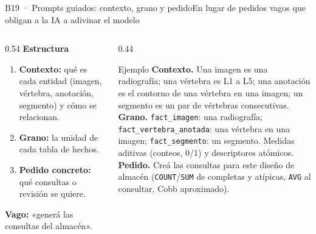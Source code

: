 \documentclass[aspectratio=169,10pt]{beamer}
\begin{document}
\begin{frame}{B19 · Prompts guiados: contexto, grano y pedido}{En lugar de pedidos vagos que obligan a la IA a adivinar el modelo}
  \begin{columns}[T]
    \begin{column}{0.54\textwidth}
      \footnotesize
      \textbf{\color{itba}Estructura}
      \begin{enumerate}\setlength{\itemsep}{0.4ex}
        \item \textbf{Contexto:} qué es cada entidad (imagen, vértebra, anotación, segmento) y cómo se relacionan.
        \item \textbf{Grano:} la unidad de cada tabla de hechos.
        \item \textbf{Pedido concreto:} qué consultas o revisión se quiere.
      \end{enumerate}
      \vspace{0.8ex}
      \textbf{\color{alerta}Vago:} «generá las consultas del almacén».
    \end{column}
    \begin{column}{0.44\textwidth}
      \begin{block}{Ejemplo}
        \scriptsize
        \textbf{Contexto.} Una imagen es una radiografía; una vértebra es L1 a L5; una anotación es el contorno de una vértebra en una imagen; un segmento es un par de vértebras consecutivas.\\[0.3ex]
        \textbf{Grano.} \texttt{fact\_imagen}: una radiografía; \texttt{fact\_vertebra\_anotada}: una vértebra en una imagen; \texttt{fact\_segmento}: un segmento. Medidas aditivas (conteos, 0/1) y descriptores atómicos.\\[0.3ex]
        \textbf{Pedido.} Creá las consultas para este diseño de almacén (\texttt{COUNT}/\texttt{SUM} de completas y atípicas, \texttt{AVG} al consultar, Cobb aproximado).
      \end{block}
    \end{column}
  \end{columns}
\end{frame}
\end{document}
